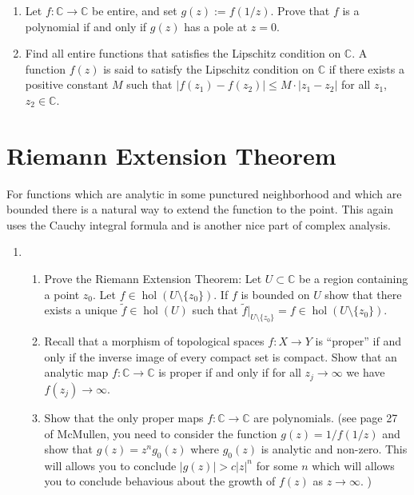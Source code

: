 \documentclass[a4paper,10pt]{article}
\newcommand{\CC}{\mathbb{C}}
\newcommand{\hol}{\operatorname{hol}}
\begin{document}
\begin{enumerate}
		\item Let $f:\mathbb{C}\to\mathbb{C}$ be entire, and set $g(z):=f(1/z)$.
		Prove that $f$ is a polynomial if and only if $g(z)$ has a pole at $z=0$.
		
		\item Find all entire functions that satisfies the Lipschitz condition on $\mathbb{C}$. A function $f(z)$ is said to satisfy the Lipschitz condition on $\mathbb{C}$ if there exists a positive constant $M$ such that $|f(z_{1})-f(z_{2})|\le M\cdot|z_{1}-z_{2}|$ for all $z_{1}$, $z_{2}\in \mathbb{C}$.
		
	\end{enumerate}
	
\newpage 

\section{Riemann Extension Theorem}
For functions which are analytic in some punctured neighborhood and which are bounded there is a natural way to extend the function to the point. This again uses the Cauchy integral formula and is another nice part of complex analysis.

\begin{enumerate}
	\item 
\begin{enumerate}
	\item Prove the Riemann Extension Theorem: Let $U\subset \CC$ be a region containing a point $z_0$. 
	Let $f \in \hol(U\setminus \lbrace z_0 \rbrace)$.
	If $f$ is bounded on $U$ show that there exists a unique $\widetilde{f} \in \hol(U)$ such that $\widetilde{f}\vert_{U \setminus \lbrace z_0 \rbrace} = f \in \hol(U \setminus \lbrace z_0 \rbrace )$.
	\item Recall that a morphism of topological spaces $f: X \to Y$ is ``proper'' if and only if the inverse image of every compact set is compact. 
	Show that an analytic map $f:\CC \to \CC$ is proper if and only if for all $z_j \to \infty$ we have $f(z_j) \to \infty$. 
	\item Show that the only proper maps $f:\CC \to \CC$ are polynomials. (see page 27 of McMullen, you need to consider the function $g(z) = 1/f(1/z)$ and show that $g(z) = z^n g_0(z)$ where $g_0(z)$ is analytic and non-zero. This will allows you to conclude $\vert g(z) \vert > c\vert z \vert^n$ for some $n$ which will allows you to conclude behavious about the growth of $f(z)$ as $z \to \infty$. )
\end{enumerate}
\end{enumerate}
\end{document}
